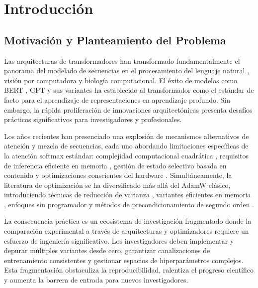 \documentclass[11pt,a4paper]{article}
\begin{document}
\tableofcontents
\newpage

\section{Introducción}

\subsection{Motivación y Planteamiento del Problema}

Las arquitecturas de transformadores han transformado fundamentalmente el panorama del modelado de secuencias en el procesamiento del lenguaje natural \citep{vaswani_attention_2017}, visión por computadora y biología computacional. El éxito de modelos como BERT \citep{devlin_bert_2019}, GPT y sus variantes ha establecido al transformador como el estándar de facto para el aprendizaje de representaciones en aprendizaje profundo. Sin embargo, la rápida proliferación de innovaciones arquitectónicas presenta desafíos prácticos significativos para investigadores y profesionales.

Los años recientes han presenciado una explosión de mecanismos alternativos de atención y mezcla de secuencias, cada uno abordando limitaciones específicas de la atención softmax estándar: complejidad computacional cuadrática \citep{child_sparse_transformer_2019}, requisitos de inferencia eficiente en memoria \citep{sun_retentive_2023,gu_mamba_2023}, gestión de estado selectivo basada en contenido \citep{behrouz_titans_2025} y optimizaciones conscientes del hardware \citep{ramapuram_theory_2024}. Simultáneamente, la literatura de optimización se ha diversificado más allá del AdamW clásico, introduciendo técnicas de reducción de varianza \citep{xie_adan_2022,pagliardini_ademamix_2024,yuan_mars_2024}, variantes eficientes en memoria \citep{shazeer_adafactor_2018,zhao_galore_2024}, enfoques sin programador \citep{defazio_road_2024} y métodos de precondicionamiento de segundo orden \citep{gupta_shampoo_2018,vyas_soap_2024}.

La consecuencia práctica es un ecosistema de investigación fragmentado donde la comparación experimental a través de arquitecturas y optimizadores requiere un esfuerzo de ingeniería significativo. Los investigadores deben implementar y depurar múltiples variantes desde cero, garantizar canalizaciones de entrenamiento consistentes y gestionar espacios de hiperparámetros complejos. Esta fragmentación obstaculiza la reproducibilidad, ralentiza el progreso científico y aumenta la barrera de entrada para nuevos investigadores.
\end{document}
